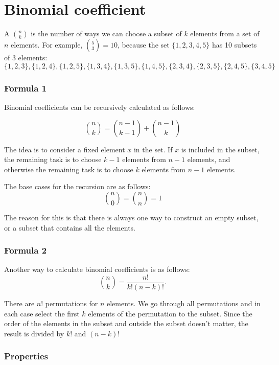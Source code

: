 \section{Binomial coefficient}


A  ${n \choose k}$
is the number of ways we can choose a subset
of $k$ elements from a set of $n$ elements.
For example, ${5 \choose 3}=10$,
because the set $\{1,2,3,4,5\}$
has 10 subsets of 3 elements:
\[ \{1,2,3\}, \{1,2,4\}, \{1,2,5\}, \{1,3,4\}, \{1,3,5\}, 
\{1,4,5\}, \{2,3,4\}, \{2,3,5\}, \{2,4,5\}, \{3,4,5\} \]

\subsubsection{Formula 1}

Binomial coefficients can be
recursively calculated as follows:

\[
{n \choose k}  =  {n-1 \choose k-1} + {n-1 \choose k}
\]

The idea is to consider a fixed
element $x$ in the set.
If $x$ is included in the subset,
the remaining task is to choose $k-1$
elements from $n-1$ elements,
and otherwise
the remaining task is to choose $k$ elements from $n-1$ elements.

The base cases for the recursion are as follows:
\[
{n \choose 0}  =  {n \choose n} = 1
\]

The reason for this is that there is always
one way to construct an empty subset,
or a subset that contains all the elements.

\subsubsection{Formula 2}

Another way to calculate binomial coefficients is as follows:
\[
{n \choose k}  =  \frac{n!}{k!(n-k)!}.
\]

There are $n!$ permutations for $n$ elements.
We go through all permutations and in each case
select the first $k$ elements of the permutation
to the subset.
Since the order of the elements in the subset
and outside the subset doesn't matter,
the result is divided by $k!$ and $(n-k)!$

\subsubsection{Properties}

